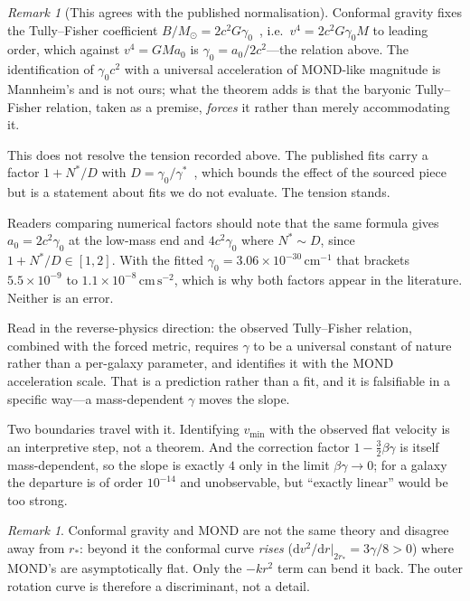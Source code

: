 \documentclass[11pt]{article}
\theoremstyle{definition}
\theoremstyle{remark}
\newtheorem{remark}[theorem]{Remark}
\newcommand{\dd}{\mathrm d}
\begin{document}
\begin{remark}[This agrees with the published normalisation]
Conformal gravity fixes the Tully--Fisher coefficient
\(B/M_{\odot}=2c^{2}G\gamma_{0}\)~\cite{OBrien2018}, i.e.\
\(v^{4}=2c^{2}G\gamma_{0}M\) to leading order, which against
\(v^{4}=GMa_{0}\) is \(\gamma_{0}=a_{0}/2c^{2}\)---the relation above.  The
identification of \(\gamma_{0}c^{2}\) with a universal acceleration of
MOND-like magnitude is Mannheim's and is not ours; what the theorem adds is
that the baryonic Tully--Fisher relation, taken as a premise, \emph{forces}
it rather than merely accommodating it.

This does not resolve the tension recorded above.  The published fits carry a
factor \(1+N^{*}/D\) with \(D=\gamma_{0}/\gamma^{*}\)~\cite{OBrien2018},
which bounds the effect of the sourced piece but is a statement about fits we
do not evaluate.  The tension stands.

Readers comparing numerical factors should note that the same formula gives
\(a_{0}=2c^{2}\gamma_{0}\) at the low-mass end and \(4c^{2}\gamma_{0}\)
where \(N^{*}\sim D\), since \(1+N^{*}/D\in[1,2]\).  With the fitted
\(\gamma_{0}=3.06\times10^{-30}\,\mathrm{cm}^{-1}\) that brackets
\(5.5\times10^{-9}\) to \(1.1\times10^{-8}\,\mathrm{cm\,s^{-2}}\), which
is why both factors appear in the literature.  Neither is an error.
\end{remark}

Read in the reverse-physics direction: the observed Tully--Fisher relation,
combined with the forced metric, requires \(\gamma\) to be a universal
constant of nature rather than a per-galaxy parameter, and identifies it with
the MOND acceleration scale.  That is a prediction rather than a fit, and it
is falsifiable in a specific way---a mass-dependent \(\gamma\) moves the
slope.

Two boundaries travel with it.  Identifying \(v_{\min}\) with the observed
flat velocity is an interpretive step, not a theorem.  And the correction
factor \(1-\tfrac{3}{2}\beta\gamma\) is itself mass-dependent, so the slope
is exactly \(4\) only in the limit \(\beta\gamma\to0\); for a galaxy the
departure is of order \(10^{-14}\) and unobservable, but ``exactly linear''
would be too strong.

\begin{remark}
Conformal gravity and MOND are not the same theory and disagree away from
\(r_{*}\): beyond it the conformal curve \emph{rises}
(\(\dd v^{2}/\dd r|_{2r_{*}}=3\gamma/8>0\)) where MOND's are asymptotically
flat.  Only the \(-kr^{2}\) term can bend it back.  The outer rotation curve
is therefore a discriminant, not a detail.
\end{remark}
\end{document}
